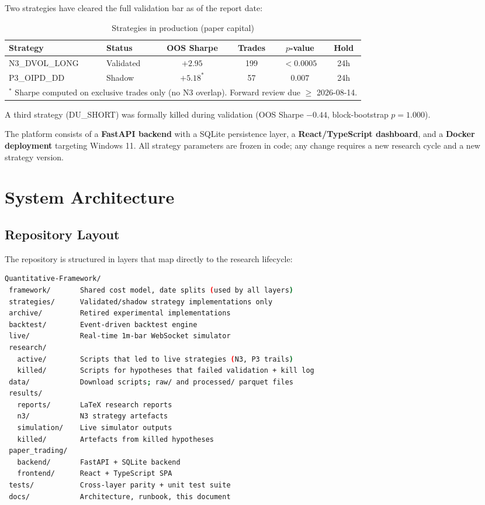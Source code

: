 \documentclass[12pt, a4paper]{article}
\theoremstyle{definition}
\begin{document}
Two strategies have cleared the full validation bar as of the report date:

\begin{table}[H]
\centering
\caption{Strategies in production (paper capital)}
\label{tab:strategy_summary}
\begin{tabular}{llcccc}
\toprule
\textbf{Strategy} & \textbf{Status} & \textbf{OOS Sharpe} & \textbf{Trades} & \textbf{$p$-value} & \textbf{Hold} \\
\midrule
N3\_DVOL\_LONG & Validated & $+2.95$ & 199 & $<0.0005$ & 24h \\
P3\_OIPD\_DD   & Shadow    & $+5.18^*$ & 57   & $0.007$   & 24h \\
\bottomrule
\multicolumn{6}{l}{\small $^*$ Sharpe computed on exclusive trades only (no N3 overlap). Forward review due \(\geq\) 2026-08-14.}
\end{tabular}
\end{table}

A third strategy (DU\_SHORT) was formally killed during validation (OOS
Sharpe $-0.44$, block-bootstrap $p = 1.000$).

The platform consists of a \textbf{FastAPI backend} with a SQLite persistence
layer, a \textbf{React/TypeScript dashboard}, and a \textbf{Docker deployment}
targeting Windows 11. All strategy parameters are frozen in code; any change
requires a new research cycle and a new strategy version.

\section{System Architecture}

\subsection{Repository Layout}

The repository is structured in layers that map directly to the research
lifecycle:

\begin{lstlisting}[language=bash, caption={Top-level directory structure}]
Quantitative-Framework/
 framework/       Shared cost model, date splits (used by all layers)
 strategies/      Validated/shadow strategy implementations only
 archive/         Retired experimental implementations
 backtest/        Event-driven backtest engine
 live/            Real-time 1m-bar WebSocket simulator
 research/
   active/        Scripts that led to live strategies (N3, P3 trails)
   killed/        Scripts for hypotheses that failed validation + kill log
 data/            Download scripts; raw/ and processed/ parquet files
 results/
   reports/       LaTeX research reports
   n3/            N3 strategy artefacts
   simulation/    Live simulator outputs
   killed/        Artefacts from killed hypotheses
 paper_trading/
   backend/       FastAPI + SQLite backend
   frontend/      React + TypeScript SPA
 tests/           Cross-layer parity + unit test suite
 docs/            Architecture, runbook, this document
\end{lstlisting}
\end{document}
